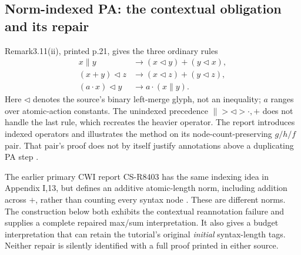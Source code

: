 \subsection{Norm-indexed PA: the contextual obligation and its repair}
\label{sec:p12-klop1987-pa-norm-proof}

Remark3.11(ii), printed p.21, gives the three ordinary rules
\begin{align*}
 x\parallel y&\to(x\mathbin{\lhd}y)+(y\mathbin{\lhd}x),\\
 (x+y)\mathbin{\lhd}z&\to(x\mathbin{\lhd}z)+(y\mathbin{\lhd}z),\\
 (a\cdot x)\mathbin{\lhd}y&\to a\cdot(x\parallel y).
\end{align*}
Here \(\lhd\) denotes the source's binary left-merge glyph, not
an inequality; \(a\) ranges over atomic-action constants. The
unindexed precedence \(\parallel>\lhd>\cdot,+\) does not handle
the last rule, which recreates the heavier operator. The report
introduces indexed operators and illustrates the method on its
node-count-preserving \(g/h/f\) pair. That pair's proof does not
by itself justify annotations above a duplicating PA step
\parencite[p.21]{Klop1987CWITutorial}.

The earlier primary CWI report CS-R8403 has the same indexing idea
in Appendix I,13, but defines an additive atomic-length norm, including
addition across \(+\), rather than counting every syntax node
\parencite[pp.30--34]{BergstraKlop1984PAIndexingReport}.
These are different norms. The construction below both exhibits the
contextual reannotation failure and supplies a complete repaired
max/sum interpretation. It also gives a budget interpretation that
can retain the tutorial's original \emph{initial} syntax-length tags.
Neither repair is silently identified with a full proof printed in
either source.

